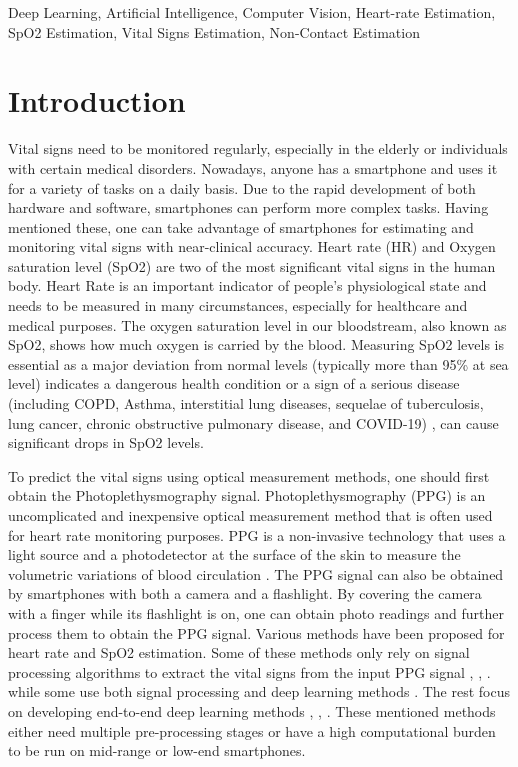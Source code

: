 \documentclass[conference]{IEEEtran}
\begin{document}
\begin{IEEEkeywords}
Deep Learning, Artificial Intelligence, Computer Vision, Heart-rate Estimation, SpO2 Estimation, Vital Signs Estimation, Non-Contact Estimation
\end{IEEEkeywords}


\section{Introduction}
Vital signs need to be monitored regularly, especially in the elderly or individuals with certain medical disorders. Nowadays, anyone has a smartphone and uses it for a variety of tasks on a daily basis. Due to the rapid development of both hardware and software, smartphones can perform more complex tasks. Having mentioned these, one can take advantage of smartphones for estimating and monitoring vital signs with near-clinical accuracy. Heart rate (HR) and Oxygen saturation level (SpO2) are two of the most significant vital signs in the human body. Heart Rate is an important indicator of people's physiological state and needs to be measured in many circumstances, especially for healthcare and medical purposes. The oxygen saturation level in our bloodstream, also known as SpO2, shows how much oxygen is carried by the blood. Measuring SpO2 levels is essential as a major deviation from normal levels (typically more than 95\% at sea level) \cite{b1} indicates a dangerous health condition or a sign of a serious disease (including COPD, Asthma, interstitial lung diseases, sequelae of tuberculosis, lung cancer, chronic obstructive pulmonary disease, and COVID-19) \cite{b2},\cite{b3} can cause significant drops in SpO2 levels.

To predict the vital signs using optical measurement methods, one should first obtain the Photoplethysmography signal. Photoplethysmography (PPG) is an uncomplicated and inexpensive optical measurement method that is often used for heart rate monitoring purposes. PPG is a non-invasive technology that uses a light source and a photodetector at the surface of the skin to measure the volumetric variations of blood circulation \cite{b4}. The PPG signal can also be obtained by smartphones with both a camera and a flashlight. By covering the camera with a finger while its flashlight is on, one can obtain photo readings and further process them to obtain the PPG signal. Various methods have been proposed for heart rate and SpO2 estimation. Some of these methods only rely on signal processing algorithms to extract the vital signs from the input PPG signal \cite{b5}, \cite{b6}, \cite{b7}. while some use both signal processing and deep learning methods \cite{b8,b9}. The rest focus on developing end-to-end deep learning methods \cite{b10}, \cite{b11}, \cite{b12}. These mentioned methods either need multiple pre-processing stages or have a high computational burden to be run on mid-range or low-end smartphones. 
\end{document}
